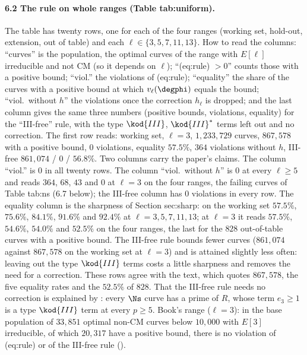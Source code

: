 \begin{sloppypar}
\paragraph{6.2 The rule on whole ranges (Table tab:uniform).} The table has twenty rows, one for each of the four ranges (working set, hold-out, extension, out
of table) and each $\ell\in\{3,5,7,11,13\}$. How to read the columns: ``curves'' is the population, the optimal curves of the range with $E[\ell]$ irreducible and
not CM (so it depends on $\ell$); ``(eq:rule) $>0$'' counts those with a positive bound; ``viol.'' the violations of (eq:rule); ``equality'' the share of the
curves with a positive bound at which $v_\ell(\degphi)$ equals the bound; ``viol.\ without $h$'' the violations once the correction $h_\ell$ is dropped; and the
last column gives the same three numbers (positive bounds, violations, equality) for the ``III-free'' rule, with the type $\kod{III}$, $\kod{III}^*$ terms left out and no
correction. The first row reads: working set, $\ell=3$, $1{,}233{,}729$ curves, $867{,}578$ with a positive bound, $0$ violations, equality $57.5\%$, $364$ violations without
$h$, III-free $861{,}074$ / $0$ / $56.8\%$. Two columns carry the paper's claims. The column ``viol.'' is $0$ in all twenty rows. The column ``viol.\ without $h$'' is $0$
at every $\ell\ge5$ and reads $364$, $68$, $43$ and $0$ at $\ell=3$ on the four ranges, the failing curves of Table tab:ns (6.7 below); the III-free column has $0$
violations in every row. The equality column is the sharpness of Section sec:sharp: on the working set $57.5\%$, $75.6\%$, $84.1\%$, $91.6\%$ and $92.4\%$ at
$\ell=3,5,7,11,13$; at $\ell=3$ it reads $57.5\%$, $54.6\%$, $54.0\%$ and $52.5\%$ on the four ranges, the last for the $828$ out-of-table curves with a positive bound. The
III-free rule bounds fewer curves ($861{,}074$ against $867{,}578$ on the working set at $\ell=3$) and is attained slightly less often: leaving out the type $\kod{III}$ terms costs
a little sharpness and removes the need for a correction. These rows agree with the text, which quotes $867{,}578$, the five equality rates and the $52.5\%$ of $828$.
That the III-free rule needs no correction is explained by : every $\Ns$ curve has a prime of $R$, whose term $e_3\ge1$ is a type $\kod{III}$ term at
every $p\ge5$. Book's range ($\ell=3$): in the base population of $33{,}851$ optimal non-CM curves below $10{,}000$ with $E[3]$ irreducible, of which $20{,}317$ have a positive bound, there is no
violation of (eq:rule) or of the III-free rule ().


\end{sloppypar}
